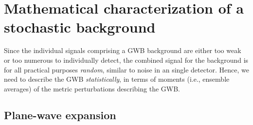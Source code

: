 \documentclass[11pt]{article}
\numberwithin{equation}{section}
\begin{document}
\section{Mathematical characterization of a stochastic background}
\label{s:mathematical_characterization}

Since the individual signals comprising a GWB 
background are either too weak or too numerous to 
individually detect, the combined signal for the 
background is for all practical purposes 
{\em random}, similar to noise in an single detector.
Hence, we need to describe the GWB {\em statistically}, 
in terms of moments 
(i.e., ensemble averages) of the metric perturbations 
describing the GWB.

\subsection{Plane-wave expansion}
\label{s:plane_wave}
\end{document}
